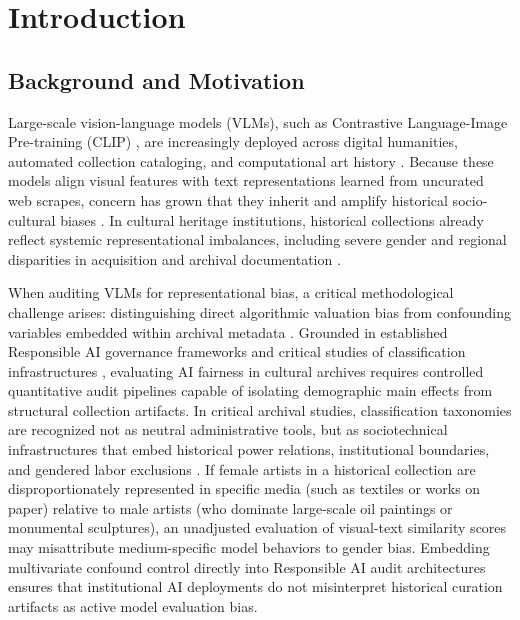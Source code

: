 \documentclass[pdflatex,sn-mathphys-num]{sn-jnl}%
\theoremstyle{thmstyleone}%
\theoremstyle{thmstyletwo}%
\theoremstyle{thmstylethree}%
\begin{document}

\maketitle

\section{Introduction}
\label{sec:introduction}

\subsection{Background and Motivation}
Large-scale vision-language models (VLMs), such as Contrastive Language-Image Pre-training (CLIP) \cite{radford2021learning}, are increasingly deployed across digital humanities, automated collection cataloging, and computational art history \cite{fiorucci2020machine, garcia2020bias}. Because these models align visual features with text representations learned from uncurated web scrapes, concern has grown that they inherit and amplify historical socio-cultural biases \cite{birhane2021multimodal, wolfe2022evidence, bender2021stochastic}. In cultural heritage institutions, historical collections already reflect systemic representational imbalances, including severe gender and regional disparities in acquisition and archival documentation \cite{topaz2019diversity, meier2021gender, carlson2022museum, bailey2020gender, nochlin1971why, pollock1988vision}.

When auditing VLMs for representational bias, a critical methodological challenge arises: distinguishing direct algorithmic valuation bias from confounding variables embedded within archival metadata \cite{hall2023auditing, buolamwini2018gender, noorthuis2020bias}. Grounded in established Responsible AI governance frameworks \cite{dignum2019responsible, stahl2021responsible, jobin2019global} and critical studies of classification infrastructures \cite{bowker2000sorting, noble2018algorithms, pasquale2015black}, evaluating AI fairness in cultural archives requires controlled quantitative audit pipelines capable of isolating demographic main effects from structural collection artifacts. In critical archival studies, classification taxonomies are recognized not as neutral administrative tools, but as sociotechnical infrastructures that embed historical power relations, institutional boundaries, and gendered labor exclusions \cite{bowker2000sorting, noble2018algorithms}. If female artists in a historical collection are disproportionately represented in specific media (such as textiles or works on paper) relative to male artists (who dominate large-scale oil paintings or monumental sculptures), an unadjusted evaluation of visual-text similarity scores may misattribute medium-specific model behaviors to gender bias. Embedding multivariate confound control directly into Responsible AI audit architectures \cite{mitchell2019model, stahl2021responsible} ensures that institutional AI deployments do not misinterpret historical curation artifacts as active model evaluation bias.
\end{document}
